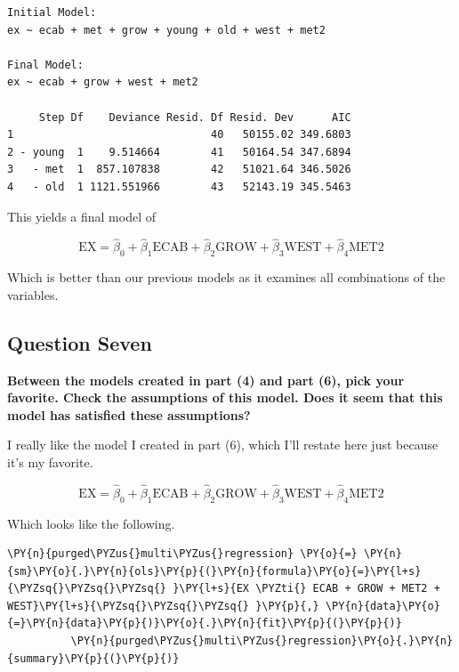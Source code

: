 \documentclass[10pt]{article}\usepackage[]{graphicx}\usepackage[]{xcolor}
\begin{document}
    
    \begin{verbatim}
Initial Model:
ex ~ ecab + met + grow + young + old + west + met2

Final Model:
ex ~ ecab + grow + west + met2

     Step Df    Deviance Resid. Df Resid. Dev      AIC
1                               40   50155.02 349.6803
2 - young  1    9.514664        41   50164.54 347.6894
3   - met  1  857.107838        42   51021.64 346.5026
4   - old  1 1121.551966        43   52143.19 345.5463

    \end{verbatim}

    
    This yields a final model of

\begin{equation}
    \text{EX} = \hat{\beta}_0 +
                \hat{\beta}_1 \text{ECAB} +
                \hat{\beta}_2 \text{GROW} +
                \hat{\beta}_3 \text{WEST} +
                \hat{\beta}_4 \text{MET2}
\end{equation}

Which is better than our previous models as it examines all combinations
of the variables.

\subsection*{Question Seven}
    \textbf{Between the models created in part (4) and part (6), pick your favorite. Check the assumptions of this
    model. Does it seem that this model has satisfied these assumptions?}\newline

    I really like the model I created in part (6), which I'll restate here
just because it's my favorite.

\begin{equation}
    \text{EX} = \hat{\beta}_0 +
                \hat{\beta}_1 \text{ECAB} +
                \hat{\beta}_2 \text{GROW} +
                \hat{\beta}_3 \text{WEST} +
                \hat{\beta}_4 \text{MET2}
\end{equation}

Which looks like the following.

    \begin{Verbatim}[commandchars=\\\{\}]
 \PY{n}{purged\PYZus{}multi\PYZus{}regression} \PY{o}{=} \PY{n}{sm}\PY{o}{.}\PY{n}{ols}\PY{p}{(}\PY{n}{formula}\PY{o}{=}\PY{l+s}{\PYZsq{}\PYZsq{}\PYZsq{} }\PY{l+s}{EX \PYZti{} ECAB + GROW + MET2 + WEST}\PY{l+s}{\PYZsq{}\PYZsq{}\PYZsq{} }\PY{p}{,} \PY{n}{data}\PY{o}{=}\PY{n}{data}\PY{p}{)}\PY{o}{.}\PY{n}{fit}\PY{p}{(}\PY{p}{)}
          \PY{n}{purged\PYZus{}multi\PYZus{}regression}\PY{o}{.}\PY{n}{summary}\PY{p}{(}\PY{p}{)}
\end{Verbatim}
\end{document}
